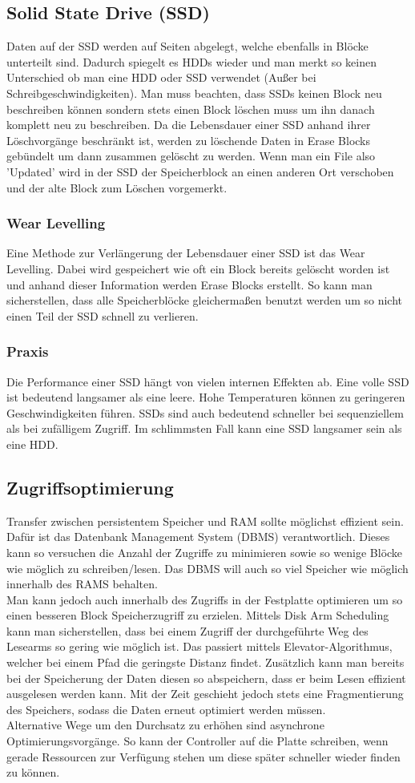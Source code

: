 \documentclass{article}
\begin{document}
	\subsection{Solid State Drive (SSD)}
	Daten auf der SSD werden auf Seiten abgelegt, welche ebenfalls in Blöcke unterteilt sind. Dadurch spiegelt es HDDs wieder und man merkt so keinen Unterschied ob man eine HDD oder SSD verwendet (Außer bei Schreibgeschwindigkeiten). Man muss beachten, dass SSDs keinen Block neu beschreiben können sondern stets einen Block löschen muss um ihn danach komplett neu zu beschreiben. Da die Lebensdauer einer SSD anhand ihrer Löschvorgänge beschränkt ist, werden zu löschende Daten in Erase Blocks gebündelt um dann zusammen gelöscht zu werden. Wenn man ein File also 'Updated' wird in der SSD der Speicherblock an einen anderen Ort verschoben und der alte Block zum Löschen vorgemerkt.
	\subsubsection{Wear Levelling}
	Eine Methode zur Verlängerung der Lebensdauer einer SSD ist das Wear Levelling. Dabei wird gespeichert wie oft ein Block bereits gelöscht worden ist und anhand dieser Information werden Erase Blocks erstellt. So kann man sicherstellen, dass alle Speicherblöcke gleichermaßen benutzt werden um so nicht einen Teil der SSD schnell zu verlieren.
	\subsubsection{Praxis}
	Die Performance einer SSD hängt von vielen internen Effekten ab. Eine volle SSD ist bedeutend langsamer als eine leere. Hohe Temperaturen können zu geringeren Geschwindigkeiten führen. SSDs sind auch bedeutend schneller bei sequenziellem als bei zufälligem Zugriff. Im schlimmsten Fall kann eine SSD langsamer sein als eine HDD.
	\subsection{Zugriffsoptimierung}
	Transfer zwischen persistentem Speicher und RAM sollte möglichst effizient sein. Dafür ist das Datenbank Management System (DBMS) verantwortlich. Dieses kann so versuchen die Anzahl der Zugriffe zu minimieren sowie so wenige Blöcke wie möglich zu schreiben/lesen. Das DBMS will auch so viel Speicher wie möglich innerhalb des RAMS behalten. \\
	Man kann jedoch auch innerhalb des Zugriffs in der Festplatte optimieren um so einen besseren Block Speicherzugriff zu erzielen. Mittels Disk Arm Scheduling kann man sicherstellen, dass bei einem Zugriff der durchgeführte Weg des Lesearms so gering wie möglich ist. Das passiert mittels Elevator-Algorithmus, welcher bei einem Pfad die geringste Distanz findet. Zusätzlich kann man bereits bei der Speicherung der Daten diesen so abspeichern, dass er beim Lesen effizient ausgelesen werden kann. Mit der Zeit geschieht jedoch stets eine Fragmentierung des Speichers, sodass die Daten erneut optimiert werden müssen. \\
	Alternative Wege um den Durchsatz zu erhöhen sind asynchrone Optimierungsvorgänge. So kann der Controller auf die Platte schreiben, wenn gerade Ressourcen zur Verfügung stehen um diese später schneller wieder finden zu können.
\end{document}
